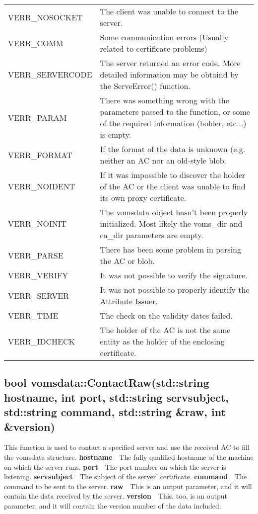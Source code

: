 \documentclass[a4paper]{book}
\newcommand{\parameter}[2]{\newline\textbf{#1}\ \ #2}
\begin{document}
\bigskip\begin{tabular}{lp{3in}}
VERR\_NOSOCKET & The client was unable to connect to the server.\\
VERR\_COMM    & Some communication errors (Usually related to
certificate problems)\\
VERR\_SERVERCODE & The server returned an error code.  More detailed
information may be obtaind by the ServeError() function.\\
VERR\_PARAM   & There was something wrong with the parameters passed to
the function, or some of the required information (holder, etc...) is
empty.\\ 
VERR\_FORMAT  & If the format of the data is unknown (e.g. neither an
AC nor an old-style blob.\\
VERR\_NOIDENT & If it was impossible to discover the holder of the
AC or the client was unable to find its own proxy certificate.\\ 
VERR\_NOINIT  & The vomsdata object hasn't been properly initialized.
Most likely the voms\_dir and ca\_dir parameters are empty.\\
VERR\_PARSE   & There has been some problem in parsing the AC or
blob.\\
VERR\_VERIFY  & It was not possible to verify the signature.\\
VERR\_SERVER  & It was not possible to properly identify the Attribute
Issuer.\\
VERR\_TIME    & The check on the validity dates failed.\\
VERR\_IDCHECK & The holder of the AC is not the same entity as the
holder of the enclosing certificate.\\
\end{tabular}

\subsection{bool vomsdata::ContactRaw(std::string hostname, int port,
  std::string servsubject, std::string command, std::string \&raw, int
  \&version)}

This function is used to contact a specified server and use the
received AC to fill the vomsdata structure.
\parameter{hostname}{The fully qualified hostname of the machine on which the server runs.}
\parameter{port}{The port number on which the server is listening.}
\parameter{servsubject}{The subject of the server' certificate.}
\parameter{command}{The command to be sent to the server.}
\parameter{raw}{This is an output parameter, and it will contain the data received by the server.}
\parameter{version}{This, too, is an output parameter, and it will contain the version number of the data included.}
\end{document}
